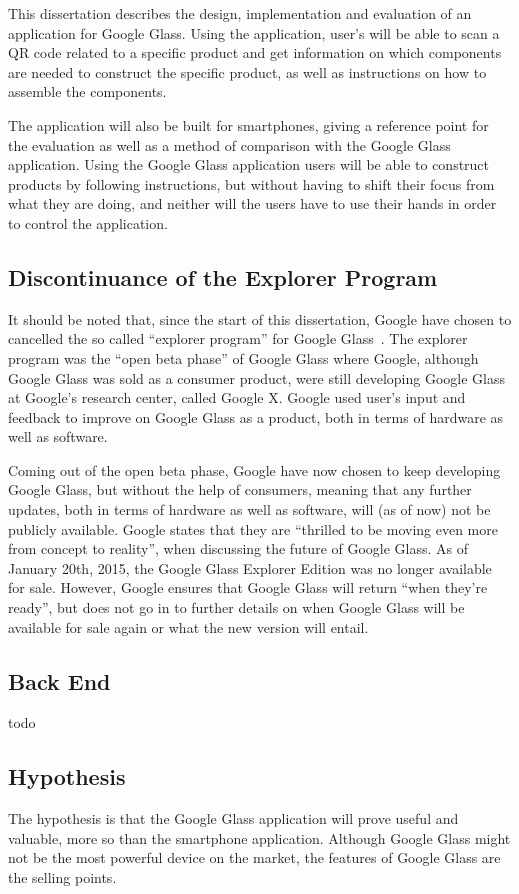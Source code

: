 This dissertation describes the design, implementation and evaluation of an application for Google Glass. Using the application, user's will be able to scan a QR code related to a specific product and get information on which components are needed to construct the specific product, as well as instructions on how to assemble the components.

The application will also be built for smartphones, giving a reference point for the evaluation as well as a method of comparison with the Google Glass application. Using the Google Glass application users will be able to construct products by following instructions, but without having to shift their focus from what they are doing, and neither will the users have to use their hands in order to control the application.

\subsection{Discontinuance of the Explorer Program}
It should be noted that, since the start of this dissertation, Google have chosen to cancelled the so called ``explorer program'' for Google Glass~\cite{glassDiscontinued}. The explorer program was the ``open beta phase'' of Google Glass where Google, although Google Glass was sold as a consumer product, were still developing Google Glass at Google's research center, called Google X. Google used user's input and feedback to improve on Google Glass as a product, both in terms of hardware as well as software.

Coming out of the open beta phase, Google have now chosen to keep developing Google Glass, but without the help of consumers, meaning that any further updates, both in terms of hardware as well as software, will (as of now) not be publicly available. Google states that they are ``thrilled to be moving even more from concept to reality'', when discussing the future of Google Glass. As of January 20th, 2015, the Google Glass Explorer Edition was no longer available for sale. However, Google ensures that Google Glass will return ``when they're ready'', but does not go in to further details on when Google Glass will be available for sale again or what the new version will entail. 

\subsection{Back End}
todo

\subsection{Hypothesis}
The hypothesis is that the Google Glass application will prove useful and valuable, more so than the smartphone application. Although Google Glass might not be the most powerful device on the market, the features of Google Glass are the selling points. 



